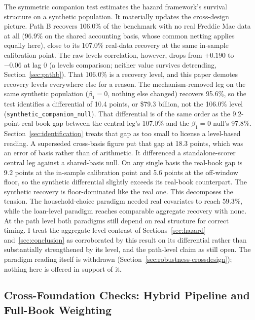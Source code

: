 \documentclass[12pt]{article}
\begin{document}
The symmetric companion test estimates the hazard framework's survival structure on a synthetic population. It materially updates the cross-design picture. Path B recovers 106.0\% of the benchmark with no real Freddie Mac data at all (96.9\% on the shared accounting basis, whose common netting applies equally here), close to its 107.0\% real-data recovery at the same in-sample calibration point. The raw levels correlation, however, drops from $+0.190$ to $-0.06$ at lag 0 (a levels comparison; neither value survives detrending, Section~\ref{sec:pathb}). That 106.0\% is a recovery level, and this paper demotes recovery levels everywhere else for a reason. The mechanism-removed leg on the same synthetic population ($\beta_1 = 0$, nothing else changed) recovers 95.6\%, so the test identifies a differential of 10.4 points, or \$79.3 billion, not the 106.0\% level (\texttt{synthetic\_companion\_null}). That differential is of the same order as the 9.2-point real-book gap between the central leg's 107.0\% and the $\beta_1 = 0$ null's 97.8\%. Section~\ref{sec:identification} treats that gap as too small to license a level-based reading. A superseded cross-basis figure put that gap at 18.3 points, which was an error of basis rather than of arithmetic. It differenced a standalone-scorer central leg against a shared-basis null. On any single basis the real-book gap is 9.2 points at the in-sample calibration point and 5.6 points at the off-window floor, so the synthetic differential slightly exceeds its real-book counterpart. The synthetic recovery is floor-dominated like the real one. This decomposes the tension. The household-choice paradigm needed real covariates to reach 59.3\%, while the loan-level paradigm reaches comparable aggregate recovery with none. At the path level both paradigms still depend on real structure for correct timing. I treat the aggregate-level contrast of Sections~\ref{sec:hazard} and~\ref{sec:conclusion} as corroborated by this result on its differential rather than substantially strengthened by its level, and the path-level claim as still open. The paradigm reading itself is withdrawn (Section~\ref{sec:robustness-crossdesign}); nothing here is offered in support of it.

\subsection{Cross-Foundation Checks: Hybrid Pipeline and Full-Book Weighting}\label{sec:robustness-hybrid}
\end{document}
